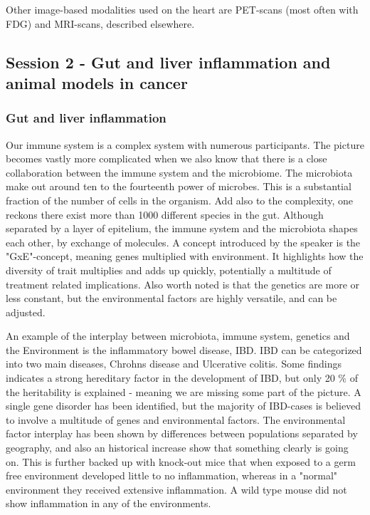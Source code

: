 \documentclass[12p]{article}
\begin{document}
Other image-based modalities used on the heart are PET-scans (most often with FDG) and MRI-scans, described elsewhere.

\subsection*{Session 2 - Gut and liver inflammation and animal models in cancer}

\subsubsection*{Gut and liver inflammation}

Our immune system is a complex system with numerous participants.
The picture becomes vastly more complicated when we also know that there is a close collaboration between the immune system and the microbiome.
The microbiota make out around ten to the fourteenth power of microbes.
This is a substantial fraction of the number of cells in the organism.
Add also to the complexity, one reckons there exist more than 1000 different species in the gut.
Although separated by a layer of epitelium, the immune system and the microbiota shapes each other, by exchange of molecules.
A concept introduced by the speaker is the "GxE"-concept, meaning genes multiplied with environment.
It highlights how the diversity of trait multiplies and adds up quickly, potentially a multitude of treatment related implications.
Also worth noted is that the genetics are more or less constant, but the environmental factors are highly versatile, and can be adjusted.

An example of the interplay between microbiota, immune system, genetics and the Environment is the inflammatory bowel disease, IBD.
IBD can be categorized into two main diseases, Chrohns disease and Ulcerative colitis.
Some findings indicates a strong hereditary factor in the development of IBD, but only 20 \% of the heritability is explained - meaning we are missing some part of the picture.
A single gene disorder has been identified, but the majority of IBD-cases is believed to involve a multitude of genes and environmental factors.
The environmental factor interplay has been shown by differences between populations separated by geography, and also an historical increase show that something clearly is going on.
This is further backed up with knock-out mice that when exposed to a germ free environment developed little to no inflammation, whereas in a "normal" environment they received extensive inflammation.
A wild type mouse did not show inflammation in any of the environments.
\end{document}
